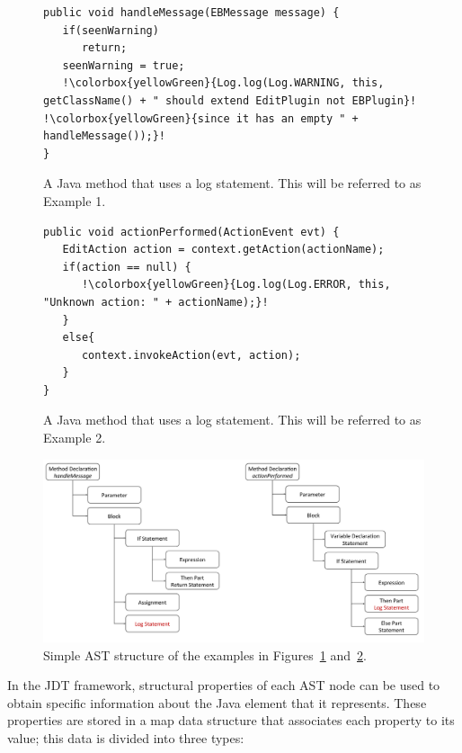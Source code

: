 \begin{figure}[p]
\def\baselinestretch{1}
\begin{lstlisting}[escapechar=!]
public void handleMessage(EBMessage message) {
   if(seenWarning)
      return;
   seenWarning = true;
   !\colorbox{yellowGreen}{Log.log(Log.WARNING, this, getClassName() + " should extend EditPlugin not EBPlugin}!  !\colorbox{yellowGreen}{since it has an empty " + handleMessage());}!
}
\end{lstlisting}
\caption[Example 1: A Java method that uses a log statement.]{A Java method that uses a log statement. This will be referred to as Example 1.\label{ch3-ex1}}
\end{figure}

\begin{figure}[p]
\def\baselinestretch{1}
\begin{lstlisting}[escapechar=!]
public void actionPerformed(ActionEvent evt) {
   EditAction action = context.getAction(actionName);
   if(action == null) {
      !\colorbox{yellowGreen}{Log.log(Log.ERROR, this, "Unknown action: " + actionName);}!
   }
   else{
      context.invokeAction(evt, action);
   }
}
\end{lstlisting}
\caption[Example 2: A Java method that uses a log statement.]{A Java method that uses a log statement. This will be referred to as Example 2.\label{ch3-ex2}}
\end{figure}

\begin{figure} [p]
  \centering\includegraphics[width = \textwidth]{Drawing4/AST.pdf}
  \caption{Simple AST structure of the examples in Figures~\ref{ch3-ex1} and~\ref{ch3-ex2}.}
  \label{fig:ast}
\end{figure}

In the JDT framework, structural properties of each AST node can be used to obtain specific information about the Java element that it represents. These properties are stored in a map data structure that associates each property to its value; this data is divided into three types:

